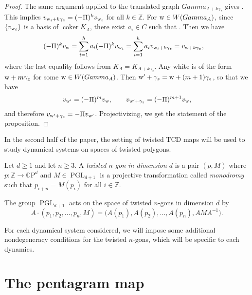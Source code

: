 \documentclass[10pt,a4paper]{amsart}
\numberwithin{equation}{section}
\newcommand{\Z}{{\mathbb Z}}
\newcommand{\C}{{\mathbb C}}
\newcommand{\CP}{{\mathbb C\mathrm P}}
\newcommand{\A}{{\mathbb A}}
\newcommand{\PGL}{\operatorname{PGL}}
\newcommand{\ra}{\rightarrow}
\newcommand{\w}{{\rm w}}
\DeclareMathOperator{\coker}{coker}
\def\A{A}
\def\Gamma{Gamma}
\def\widehat#1{#1}
\def\C{C}
\begin{document}
\begin{proof}
		The same argument applied to the translated graph $\Gamma_{\A+k \gamma_z}$ gives . This implies $v_{{\rm w}_i+k\gamma_z}=(-\Pi{})^k v_{{\rm w}_i}$ for all $k \in \Z$.
		For ${\rm w} \in W(\Gamma_{ \A})$, since $\{v_{\w_i}\}$ is a basis {of $\coker K_\A$}, there exist $a_i\in\C$ such that . Then we have
  \begin{align*}(-\Pi{})^k v_{{\rm w}}&=\sum_{i=1}^h a_i (-\Pi{})^k v_{{\rm w}_i} = \sum_{i=1}^h a_i v_{{\rm w}_i+k\gamma_z} =v_{{\rm w}+k\gamma_z},
		\end{align*}
		where the last equality follows from $K_{\A}{}=K_{{\A+ k \gamma_z}}{}$. Any white \smash{${\rm w}'\in W\bigl(\Gamma_{\widehat \A}\bigr)$} is of the form~${\rm w}+m\gamma_z$ for some ${\rm w} \in W(\Gamma_{\A})$. Then ${\rm w}'+\gamma_z={\rm w}+(m+1) \gamma_z$, so that we have
		\[
		v_{{\rm w}'}=(-\Pi{})^m v_{{\rm w}}, \qquad v_{{\rm w}'+\gamma_z}=(-\Pi{})^{m+1}v_{\rm w},
		\]
		and therefore $v_{{\rm w}'+\gamma_z}=-\Pi{}v_{{\rm w}'}$. Projectivizing, we get the statement of the proposition.
	\end{proof}
	
	In the second half of the paper, the setting of twisted TCD maps will be used to study dynamical systems on spaces of twisted polygons.
	
	\begin{Definition}
		Let $d\geq1$ and let $n \geq 3$. A \emph{twisted $n$-gon in dimension $d$} is a pair $(p,M)$ where $p\colon \Z \ra \CP^d$ and $M \in \PGL_{d+1}$ is a projective transformation called \emph{monodromy} such that $p_{i+n}=M(p_i)$ for all $i \in \Z$.
		
		The group $\PGL_{d+1}$ acts on the space of twisted $n$-gons in dimension $d$ by
		\begin{equation}
			\label{eq:pglaction}
			A \cdot (p_1,p_2,\dots,p_n,M) = \big(A(p_1),A(p_2),\dots,A(p_n),AMA^{-1}\big).
		\end{equation}
	\end{Definition}
	
	For each dynamical system considered, we will impose some additional nondegeneracy conditions for the twisted $n$-gons, which will be specific to each dynamics.
	
\section{The pentagram map}\label{sec:pentagram}
	
\end{document}
